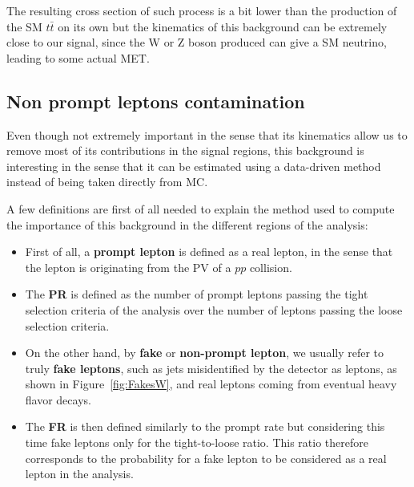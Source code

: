 \documentclass[a4paper, 10pt, openright]{report}
\begin{document}
The resulting cross section of such process is a bit lower than the production of the \ac{SM} $t \bar t$ on its own but the kinematics of this background can be extremely close to our signal, since the W or Z boson produced can give a \ac{SM} neutrino, leading to some actual \ac{MET}.

\subsection{Non prompt leptons contamination} \label{subsection:Fakes}

Even though not extremely important in the sense that its kinematics allow us to remove most of its contributions in the signal regions, this background is interesting in the sense that it can be estimated using a data-driven method instead of being taken directly from \ac{MC}.

A few definitions are first of all needed to explain the method used to compute the importance of this background in the different regions of the analysis:
\begin{itemize}
\item First of all, a \textbf{prompt lepton} is defined as a real lepton, in the sense that the lepton is originating from the \ac{PV} of a $pp$ collision.
\item The \textbf{\ac{PR}} is defined as the number of prompt leptons passing the tight selection criteria of the analysis over the number of leptons passing the loose selection criteria. 
\item On the other hand, by \textbf{fake} or \textbf{non-prompt lepton}, we usually refer to truly \textbf{fake leptons}, such as jets misidentified by the detector as leptons, as shown in Figure~\ref{fig:FakesW}, and real leptons coming from eventual heavy flavor decays.
\item The \textbf{\ac{FR}} is then defined similarly to the prompt rate but considering this time fake leptons only for the tight-to-loose ratio. This ratio therefore corresponds to the probability for a fake lepton to be considered as a real lepton in the analysis.
\end{itemize}
\end{document}
